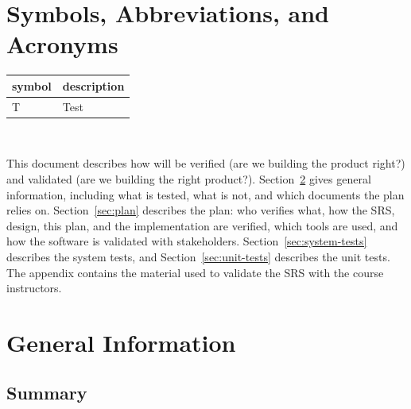 \documentclass[12pt, titlepage]{article}
\begin{document}
\listoffigures
{}

\newpage

\section{Symbols, Abbreviations, and Acronyms}

\renewcommand{\arraystretch}{1.2}
\begin{tabular}{l l} 
  \toprule		
  \textbf{symbol} & \textbf{description}\\
  \midrule 
  T & Test\\
  \bottomrule
\end{tabular}\\



\newpage


  This document describes how \projname{} will be verified (are we building the
  product right?) and validated (are we building the right product?). Section~\ref{sec:general}
  gives general information, including what is tested, what is not, and which documents the plan
  relies on. Section~\ref{sec:plan} describes the plan: who verifies what, how the SRS, design,
  this plan, and the implementation are verified, which tools are used, and how the software is
  validated with stakeholders. Section~\ref{sec:system-tests} describes the system tests, and
  Section~\ref{sec:unit-tests} describes the unit tests. The appendix contains the material used to
  validate the SRS with the course instructors.

\section{General Information}
\label{sec:general}

\subsection{Summary}
\end{document}
